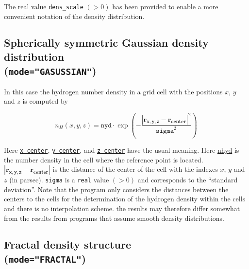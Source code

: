 \documentclass[a4paper,10pt]{article}
\begin{document}
\begin{appendix}
The real value \texttt{dens\_scale} $(>0)$ has been provided to 
enable a more convenient notation of the density distribution.

\subsection{Spherically symmetric Gaussian density distribution\\
(\texttt{mode="GASUSSIAN"})}
In this case the hydrogen number density in a grid cell with the positions $x$, 
$y$ and $z$ is computed by

\begin{equation}
 n_H(x,y,z) = \mathtt{nyd} \cdot \exp\left(- \frac{\left|\mathbf{r_{x,y,z}} - 
\mathbf{r_{center}} \right|^2}{\mathtt{sigma}^2}\right)
\end{equation}

Here \hyperref[hydopt:xcenter]{\texttt{x\_center}}, 
\hyperref[hydopt:ycenter]{\texttt{y\_center}}, 
and \hyperref[hydopt:zcenter]{\texttt{z\_center}} have the 
usual meaning. 
Here \hyperref[hydopt:nhyd]{nhyd} is the number density in the cell where the 
reference point is located. 
$\left|\mathbf{r_{x,y,z}} - \mathbf{r_{center}} \right|$ is the
distance of the center of the cell with the indexes $x$, $y$ and $z$ (in 
parsec). 
\texttt{sigma} is a \texttt{real} value $(>0)$ and corresponds to the ``standard
deviation''.
Note that the program only considers the distances between the centers to the 
cells for the determination of the hydrogen density within the cells and there 
is no interpolation scheme. the results may therefore differ somewhat from the 
results from programs that assume smooth density distributions.

\subsection{Fractal density structure\\
(\texttt{mode="FRACTAL"})}


\end{appendix}
\end{document}
